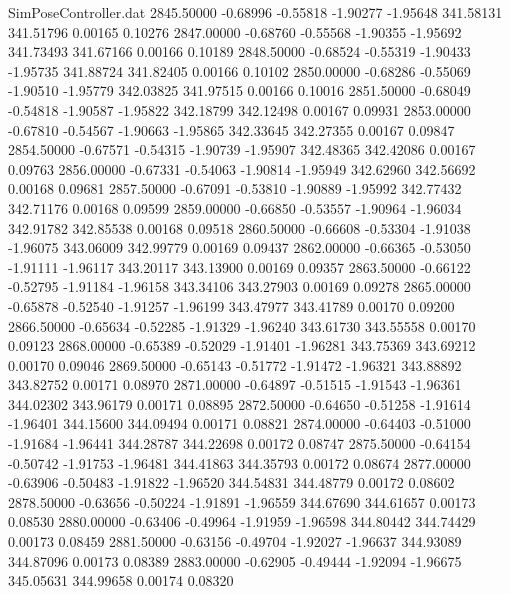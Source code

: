 \begin{filecontents}{SimPoseController.dat}
2845.50000   -0.68996   -0.55818    -1.90277   -1.95648  341.58131  341.51796    0.00165    0.10276
2847.00000   -0.68760   -0.55568    -1.90355   -1.95692  341.73493  341.67166    0.00166    0.10189
2848.50000   -0.68524   -0.55319    -1.90433   -1.95735  341.88724  341.82405    0.00166    0.10102
2850.00000   -0.68286   -0.55069    -1.90510   -1.95779  342.03825  341.97515    0.00166    0.10016
2851.50000   -0.68049   -0.54818    -1.90587   -1.95822  342.18799  342.12498    0.00167    0.09931
2853.00000   -0.67810   -0.54567    -1.90663   -1.95865  342.33645  342.27355    0.00167    0.09847
2854.50000   -0.67571   -0.54315    -1.90739   -1.95907  342.48365  342.42086    0.00167    0.09763
2856.00000   -0.67331   -0.54063    -1.90814   -1.95949  342.62960  342.56692    0.00168    0.09681
2857.50000   -0.67091   -0.53810    -1.90889   -1.95992  342.77432  342.71176    0.00168    0.09599
2859.00000   -0.66850   -0.53557    -1.90964   -1.96034  342.91782  342.85538    0.00168    0.09518
2860.50000   -0.66608   -0.53304    -1.91038   -1.96075  343.06009  342.99779    0.00169    0.09437
2862.00000   -0.66365   -0.53050    -1.91111   -1.96117  343.20117  343.13900    0.00169    0.09357
2863.50000   -0.66122   -0.52795    -1.91184   -1.96158  343.34106  343.27903    0.00169    0.09278
2865.00000   -0.65878   -0.52540    -1.91257   -1.96199  343.47977  343.41789    0.00170    0.09200
2866.50000   -0.65634   -0.52285    -1.91329   -1.96240  343.61730  343.55558    0.00170    0.09123
2868.00000   -0.65389   -0.52029    -1.91401   -1.96281  343.75369  343.69212    0.00170    0.09046
2869.50000   -0.65143   -0.51772    -1.91472   -1.96321  343.88892  343.82752    0.00171    0.08970
2871.00000   -0.64897   -0.51515    -1.91543   -1.96361  344.02302  343.96179    0.00171    0.08895
2872.50000   -0.64650   -0.51258    -1.91614   -1.96401  344.15600  344.09494    0.00171    0.08821
2874.00000   -0.64403   -0.51000    -1.91684   -1.96441  344.28787  344.22698    0.00172    0.08747
2875.50000   -0.64154   -0.50742    -1.91753   -1.96481  344.41863  344.35793    0.00172    0.08674
2877.00000   -0.63906   -0.50483    -1.91822   -1.96520  344.54831  344.48779    0.00172    0.08602
2878.50000   -0.63656   -0.50224    -1.91891   -1.96559  344.67690  344.61657    0.00173    0.08530
2880.00000   -0.63406   -0.49964    -1.91959   -1.96598  344.80442  344.74429    0.00173    0.08459
2881.50000   -0.63156   -0.49704    -1.92027   -1.96637  344.93089  344.87096    0.00173    0.08389
2883.00000   -0.62905   -0.49444    -1.92094   -1.96675  345.05631  344.99658    0.00174    0.08320

\end{filecontents}
